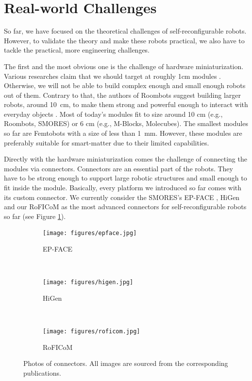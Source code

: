 \section{Real-world Challenges}\label{sec:mixed-challenges}

So far, we have focused on the theoretical challenges of self-reconfigurable
robots. However, to validate the theory and make these robots practical, we
also have to tackle the practical, more engineering challenges.

The first and the most obvious one is the challenge of hardware miniaturization.
Various researches claim that we should target at roughly 1cm modules
\cite{1285597, DBLP:conf/ieeealife/Christensen07}. Otherwise, we will not be
able to build complex enough and small enough robots out of them. Contrary to
that, the authors of Roombots suggest building larger robots, around 10~cm, to
make them strong and powerful enough to interact with everyday objects
\cite{DBLP:conf/icra/SprowitzBDI09}. Most of today's modules fit to size around
10 cm (e.g., Roombots, SMORES) or 6 cm (e.g., M-Blocks, Molecubes). The smallest
modules so far are Femtobots \cite{Femtobots} with a size of less than 1~mm.
However, these modules are preferably suitable for smart-matter due to their
limited capabilities.

Directly with the hardware miniaturization comes the challenge of connecting the
modules via connectors. Connectors are an essential part of the robots. They
have to be strong enough to support large robotic structures and small enough to
fit inside the module. Basically, every platform we introduced so far comes with
its custom connector. We currently consider the SMORES's EP-FACE
\cite{DBLP:conf/iros/TosunDLY16}, HiGen \cite{DBLP:conf/iros/ParrottDG14} and
our RoFICoM \cite{DBLP:conf/iros/MrazekB19} as the most advanced connectors for
self-reconfigurable robots so far (see Figure \ref{fig:connectors}).

\begin{figure}[!t]
    \centering
    \begin{subfigure}[b]{0.315\textwidth}
        \centering
        \texttt{[image: figures/epface.jpg]}
        \caption{EP-FACE}
    \end{subfigure}
    ~
    \begin{subfigure}[b]{0.315\textwidth}
        \centering
        \texttt{[image: figures/higen.jpg]}
        \caption{HiGen}
    \end{subfigure}
    ~
    \begin{subfigure}[b]{0.315\textwidth}
        \centering
        \texttt{[image: figures/roficom.jpg]}
        \caption{RoFICoM}
    \end{subfigure}

    \caption{Photos of connectors. All images are sourced from the corresponding publications.}
    \label{fig:connectors}
\end{figure}

